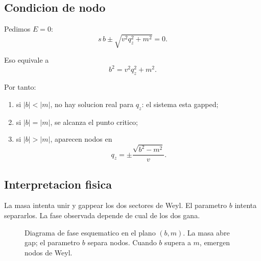 \subsection{Condicion de nodo}

Pedimos \(E=0\):
\begin{equation}
s\,b \pm \sqrt{v^2 q_z^2 + m^2}=0.
\end{equation}

Eso equivale a
\begin{equation}
b^2 = v^2 q_z^2 + m^2.
\end{equation}

Por tanto:

\begin{enumerate}[leftmargin=*]
  \item si \(|b|<|m|\), no hay solucion real para \(q_z\): el sistema esta gapped;
  \item si \(|b|=|m|\), se alcanza el punto critico;
  \item si \(|b|>|m|\), aparecen nodos en
  \begin{equation}
  q_z=\pm \frac{\sqrt{b^2-m^2}}{v}.
  \label{c13:eq:phase-nodes}
  \end{equation}
\end{enumerate}

\subsection{Interpretacion fisica}

La masa intenta unir y gappear los dos sectores de Weyl. El parametro \(b\) intenta separarlos. La fase observada depende de cual de los dos gana.

\begin{figure}[ht]
\centering
{}
\caption{Diagrama de fase esquematico en el plano \((b,m)\). La masa abre gap; el parametro \(b\) separa nodos. Cuando \(b\) supera a \(m\), emergen nodos de Weyl.}
\label{c13:fig:phase-diagram}
\end{figure}

